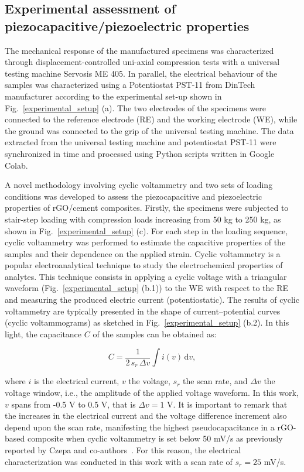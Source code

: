 \documentclass[a4paper,fleqn]{cas-sc}
\begin{document}
\subsection{Experimental assessment of piezocapacitive/piezoelectric properties}\label{piezo_char}

The mechanical response of the manufactured specimens was characterized through displacement-controlled uni-axial compression tests with a universal testing machine Servosis ME 405. In parallel, the electrical behaviour of the samples was characterized using a Potentiostat PST-11 from DinTech manufacturer according to the experimental set-up shown in Fig.~\ref{experimental_setup} (a). The two electrodes of the specimens were connected to the reference electrode (RE) and the working electrode (WE), while the ground was connected to the grip of the universal testing machine. The data extracted from the universal testing machine and potentiostat PST-11 were synchronized in time and processed using Python scripts written in Google Colab. 

A novel methodology involving cyclic voltammetry and two sets of loading conditions was developed to assess the piezocapacitive and piezoelectric properties of rGO/cement composites. Firstly, the specimens were subjected to stair-step loading with compression loads increasing from 50 kg to 250 kg, as shown in Fig.~\ref{experimental_setup} (c). For each step in the loading sequence, cyclic voltammetry was performed to estimate the capacitive properties of the samples and their dependence on the applied strain. Cyclic voltammetry is a popular electroanalytical technique to study the electrochemical properties of analytes. This technique consists in applying a cyclic voltage with a triangular waveform (Fig.~\ref{experimental_setup} (b.1)) to the WE with respect to the RE and measuring the produced electric current (potentiostatic). The results of cyclic voltammetry are typically presented in the shape of current–potential curves (cyclic voltammograms) as sketched in Fig.~\ref{experimental_setup} (b.2). In this light, the capacitance $C$ of the samples can be obtained as:

\begin{equation}\label{cap}
    C = \frac{1}{2 \, s_r \, \Delta v }\int i(v) \, \textrm{d}v,
\end{equation}

\noindent where $i$ is the electrical current, $v$ the voltage, $s_r$ the scan rate, and $\Delta v$ the voltage window, i.e., the amplitude of the applied voltage waveform. In this work, $v$ spans from -0.5 V to 0.5 V, that is $\Delta v = 1$ V. It is important to remark that the increases in the electrical current and the voltage difference increment also depend upon the scan rate, manifesting the highest pseudocapacitance in a rGO-based composite when cyclic voltammetry is set below 50 mV/s as previously reported by Czepa and co-authors~\cite{czepa2020reduced}. For this reason, the electrical characterization was conducted in this work with a scan rate of $s_r=25$ mV/s. 
\end{document}
